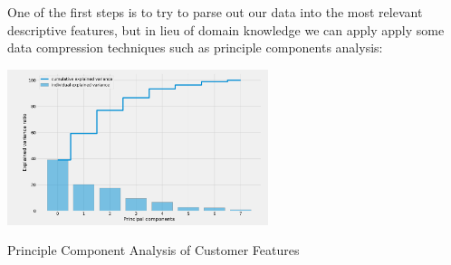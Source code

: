 \documentclass{tufte-handout}
\begin{document}
One of the first steps is to try to parse out our data into the most relevant descriptive features, but in lieu of domain knowledge we can apply apply some data compression techniques such as principle components analysis:

\begin{marginfigure}
\includegraphics[width=3in, height=5.in]{Plots/pca_explained_variance.png}
\caption{Principle Component Analysis of Customer Features}
\end{marginfigure}
\end{document}
